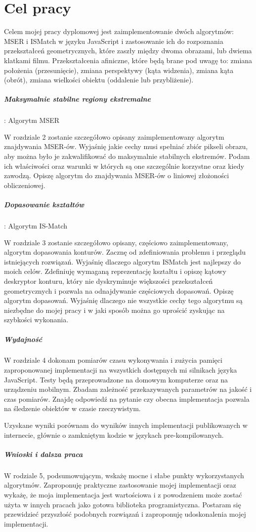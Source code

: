 \section{Cel pracy}

Celem mojej pracy dyplomowej jest zaimplementowanie dwóch algorytmów: MSER i
ISMatch w języku JavaScript i zastosowanie ich do rozpoznania przekształceń
geometrycznych, które zaszły między dwoma obrazami, lub dwiema klatkami filmu.
Przekształcenia afiniczne, które będą brane pod uwagę to: zmiana położenia
(przesunięcie), zmiana perspektywy (kąta widzenia), zmiana kąta (obrót), zmiana
wielkości obiektu (oddalenie lub przybliżenie).

\subparagraph{Maksymalnie stabilne regiony ekstremalne}: Algorytm MSER

W rozdziale 2 zostanie szczegółowo opisany zaimplementowany algorytm
znajdywania MSER-ów. Wyjaśnię jakie cechy musi spełniać zbiór pikseli obrazu,
aby można było je zakwalifikować do maksymalnie stabilnych ekstremów.  Podam
ich właściwości oraz warunki w których są one szczególnie korzystne oraz kiedy
zawodzą. Opiszę algorytm do znajdywania MSER-ów o liniowej złożoności
obliczeniowej.

\subparagraph{Dopasowanie kształtów}: Algorytm IS-Match

W rozdziale 3 zostanie szczegółowo opisany, częściowo zaimplementowany,
algorytm dopasowania konturów. Zacznę od zdefiniowania problemu i przeglądu
istniejących rozwiązań. Wyjaśnię dlaczego algorytm ISMatch jest najlepszy do
moich celów. Zdefiniuję wymaganą reprezentację kształtu i opiszę kątowy
deskryptor konturu, który nie dyskryminuje większości przekształceń
geometrycznych i pozwala na odnajdywanie częściowych dopasowań. Opiszę algorytm
dopasowań. Wyjaśnię dlaczego nie wszystkie cechy tego algorytmu są niezbędne
do mojej pracy i w jaki sposób można go uprościć zyskując na szybkości
wykonania.

\subparagraph{Wydajność}

W rozdziale 4 dokonam pomiarów czasu wykonywania i zużycia pamięci
zaproponowanej implementacji na wszystkich dostępnych mi silnikach języka
JavaScript. Testy będą przeprowadzone na domowym komputerze oraz na urządzeniu
mobilnym.  Zbadam zależność przekazywanych parametrów na jakość i czas
pomiarów. Znajdę odpowiedź na pytanie czy obecna implementacja pozwala na
śledzenie obiektów w czasie rzeczywistym.

Uzyskane wyniki porównam do wyników innych implementacji publikowanych w
internecie, głównie o zamkniętym kodzie w językach pre-kompilowanych.

\subparagraph{Wnioski i dalsza praca}

W rodziale 5, podsumowującym, wskażę mocne i słabe punkty wykorzystanych
algorytmów. Zaproponuję praktyczne zastosowanie mojej implementacji oraz
wykażę, że moja implementacja jest wartościowa i z powodzeniem może zostać
użyta w innych pracach jako gotowa biblioteka programistyczna. Postaram się
przewidzieć przyszłość podobnych rozwiązań i zaproponuję udoskonalenia mojej
implementacji.
